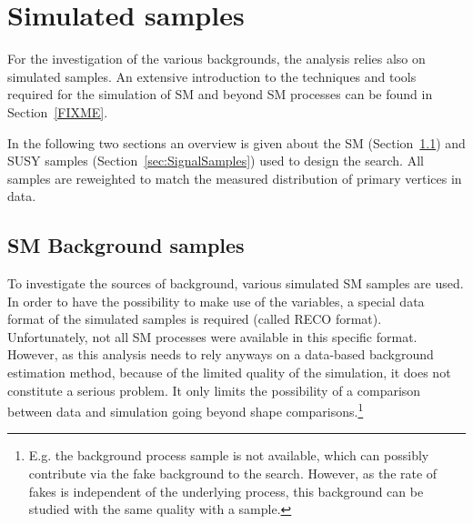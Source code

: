 \section{Simulated samples}
\label{sec:SimulatedSamples}

For the investigation of the various backgrounds, the analysis relies also on simulated samples.
An extensive introduction to the techniques and tools required for the simulation of SM and beyond SM processes can be found in Section~\ref{FIXME}.

In the following two sections an overview is given about the SM (Section~\ref{sec:SMSamples}) and SUSY samples (Section~\ref{sec:SignalSamples}) used to design the search.
All samples are reweighted to match the measured distribution of primary vertices in data.

\subsection{SM Background samples}
\label{sec:SMSamples}
To investigate the sources of background, various simulated SM samples are used.
In order to have the possibility to make use of the \dedx variables, a special data format of the simulated samples is required (called RECO format).
Unfortunately, not all SM processes were available in this specific format.
However, as this analysis needs to rely anyways on a data-based background estimation method, because of the limited quality of the \dedx simulation,
it does not constitute a serious problem.
It only limits the possibility of a comparison between data and simulation going beyond shape comparisons.\footnote{E.g. the background process \ZInvJets sample is not available, which can possibly contribute via the fake background to the search. However, as the rate of fakes is independent of the underlying process, this background can be studied with the same quality with a \WJets sample.}

